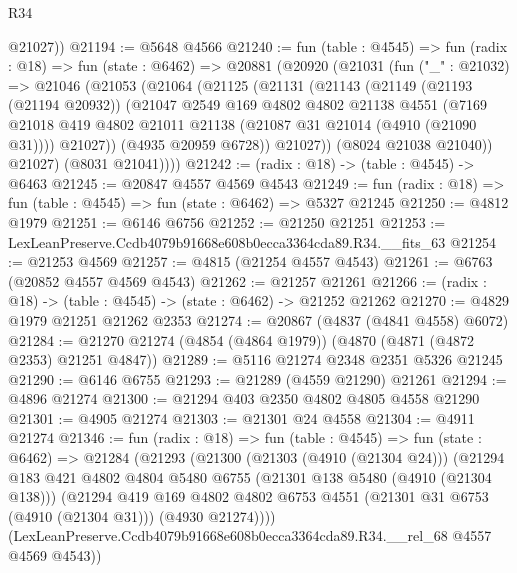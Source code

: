 \begin{lexlean}{R34}
\begin{coremodule}
        @21027))
@21194 := @5648 @4566
@21240 := fun (table : @4545) =>
  fun (radix : @18) =>
  fun (state : @6462) =>
  @20881
    (@20920
      (@21031
        (fun ("_" : @21032) =>
        @21046
          (@21053
            (@21064
              (@21125
                (@21131
                  (@21143
                    (@21149
                      (@21193 (@21194 @20932))
                      (@21047
                        @2549
                        @169
                        @4802
                        @4802
                        @21138
                        @4551
                        (@7169
                          @21018
                          @419
                          @4802
                          @21011
                          @21138
                          (@21087 @31 @21014 (@4910 (@21090 @31))))
                        @21027))
                    (@4935 @20959 @6728))
                  @21027))
              (@8024 @21038 @21040))
            @21027)
          (@8031 @21041))))
@21242 := (radix : @18) -> (table : @4545) -> @6463
@21245 := @20847 @4557 @4569 @4543
@21249 := fun (radix : @18) => fun (table : @4545) => fun (state : @6462) => @5327 @21245
@21250 := @4812 @1979
@21251 := @6146 @6756
@21252 := @21250 @21251
@21253 := LexLeanPreserve.Ccdb4079b91668e608b0ecca3364cda89.R34.__fits_63
@21254 := @21253 @4569
@21257 := @4815 (@21254 @4557 @4543)
@21261 := @6763 (@20852 @4557 @4569 @4543)
@21262 := @21257 @21261
@21266 := (radix : @18) -> (table : @4545) -> (state : @6462) -> @21252 @21262
@21270 := @4829 @1979 @21251 @21262 @2353
@21274 := @20867 (@4837 (@4841 @4558) @6072)
@21284 := @21270 @21274 (@4854 (@4864 @1979)) (@4870 (@4871 (@4872 @2353) @21251 @4847))
@21289 := @5116 @21274 @2348 @2351 @5326 @21245
@21290 := @6146 @6755
@21293 := @21289 (@4559 @21290) @21261
@21294 := @4896 @21274
@21300 := @21294 @403 @2350 @4802 @4805 @4558 @21290
@21301 := @4905 @21274
@21303 := @21301 @24 @4558
@21304 := @4911 @21274
@21346 := fun (radix : @18) =>
  fun (table : @4545) =>
  fun (state : @6462) =>
  @21284
    (@21293
      (@21300
        (@21303 (@4910 (@21304 @24)))
        (@21294
          @183
          @421
          @4802
          @4804
          @5480
          @6755
          (@21301 @138 @5480 (@4910 (@21304 @138)))
          (@21294
            @419
            @169
            @4802
            @4802
            @6753
            @4551
            (@21301 @31 @6753 (@4910 (@21304 @31)))
            (@4930 @21274))))
      (LexLeanPreserve.Ccdb4079b91668e608b0ecca3364cda89.R34.__rel_68 @4557 @4569 @4543))

\end{coremodule}
\end{lexlean}
